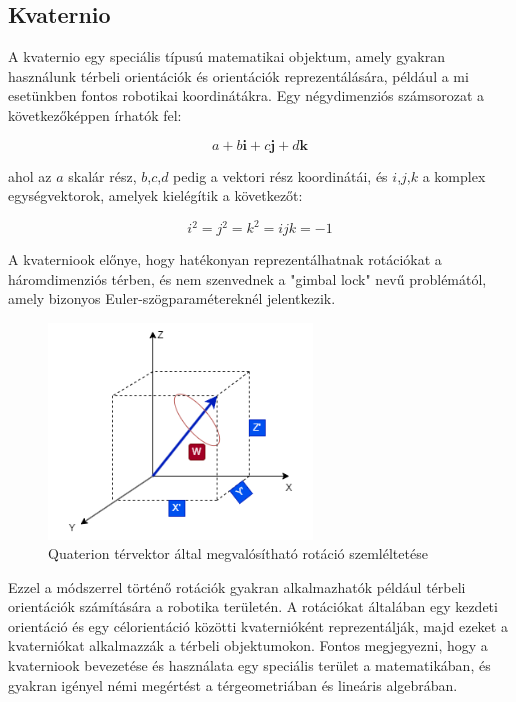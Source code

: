 \subsection{Kvaternio}
A kvaternio egy speciális típusú matematikai objektum, amely gyakran használunk térbeli orientációk és orientációk reprezentálására, például a mi esetünkben fontos robotikai koordinátákra. Egy négydimenziós számsorozat a következőképpen írhatók fel:

\begin{equation}
a + b \textbf{i} + c \textbf{j} + d \textbf{k} 
\end{equation}

ahol az $a$ skalár rész, $b$,$c$,$d$ pedig a vektori rész koordinátái, és $i$,$j$,$k$ a komplex egységvektorok, amelyek kielégítik a következőt: 

\begin{equation}
i^2=j^2=k^2=ijk=-1
\end{equation}

A kvaterniook előnye, hogy hatékonyan reprezentálhatnak rotációkat a háromdimenziós térben, és nem szenvednek a "gimbal lock" nevű problémától, amely bizonyos Euler-szögparamétereknél jelentkezik.

\begin{figure}[!ht]
\centering
\includegraphics[width=70mm, keepaspectratio]{figures/Diagrammok/Quaterion}
\caption{Quaterion térvektor által megvalósítható rotáció szemléltetése}
\label{fig:Quaterion}
\end{figure}

Ezzel a módszerrel történő rotációk gyakran alkalmazhatók például térbeli orientációk számítására a robotika területén. A rotációkat általában egy kezdeti orientáció és egy célorientáció közötti kvaternióként reprezentálják, majd ezeket a kvaterniókat alkalmazzák a térbeli objektumokon. Fontos megjegyezni, hogy a kvaterniook bevezetése és használata egy speciális terület a matematikában, és gyakran igényel némi megértést a térgeometriában és lineáris algebrában.


